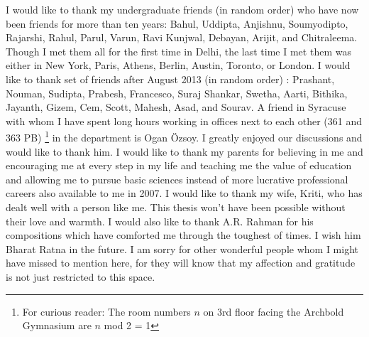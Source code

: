 I would like to thank my undergraduate friends (in random order) who have now been friends for 
more than ten years: Bahul, Uddipta, Anjishnu, Soumyodipto, Rajarshi, Rahul, Parul, Varun, Ravi Kunjwal, Debayan, Arijit, and Chitraleema. 
Though I met them all for the first time in Delhi, the last time I met them was either in New York, Paris, Athens, 
Berlin, Austin, Toronto, or London. I would like to thank set of friends after August 2013 (in random order) : 
Prashant, Nouman, Sudipta, Prabesh, Francesco, Suraj Shankar, Swetha, Aarti, Bithika, Jayanth,  
Gizem, Cem, Scott, Mahesh, Asad, and Sourav. 
A friend in Syracuse with whom I have spent long hours working in offices next to each other (361 and 363 PB) \footnote{
For curious reader: The room numbers $n$ on 3rd floor facing the Archbold Gymnasium are $\textit{n}$ mod 2 = 1} in 
the department is Ogan \"{O}zsoy. I greatly enjoyed our discussions and would like to thank him. I would like to thank my parents for 
believing in me and encouraging me at every step in my life and teaching me the value of education and allowing me 
to pursue basic sciences instead of more lucrative professional careers also available to me in 2007. 
I would like to thank my wife, Kriti, who has dealt well with a person like me.
This thesis won't have been possible without their love and warmth. 
I would also like to thank A.R. Rahman for his compositions which have comforted me through the toughest of times. 
I wish him Bharat Ratna in the future. I am sorry for other wonderful people whom I might have missed to mention here, 
for they will know that my affection and gratitude is not just restricted to this space.





